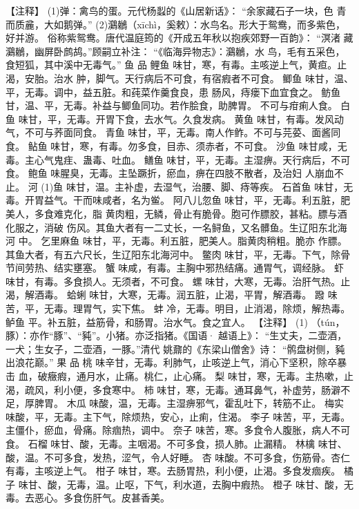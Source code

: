 \documentclass[12pt,UTF8]{ctexbook}
\begin{document}
【注释】
(1)弹：禽鸟的蛋。元代杨蠫的《山居新话》：
“余家藏石子一块，色
青而质麄，大如鹅弹。”
(2)鸂鶒（xīchì，奚敕）：水鸟名。形大于鸳鸯，而多紫色，好并游。
俗称紫鸳鸯。唐代温庭筠的《开成五年秋以抱疾郊野一百韵》：
“溟渚
藏鸂鶒，幽屏卧鹧鸪。”顾嗣立补注：
“《临海异物志》：鸂鶒，水
鸟，毛有五采色，食短狐，其中溪中无毒气。”
鱼 品
鲤鱼 味甘，寒，有毒。主咳逆上气，黄疸。止渴，安胎。治水
肿，脚气。天行病后不可食，有宿瘕者不可食。
鲫鱼 味甘，温、平，无毒。调中，益五脏。和莼菜作羹食良，患
肠风，痔瘘下血宜食之。
鲂鱼 甘，温、平，无毒。补益与鲫鱼同功。若作脍食，助脾胃。
不可与疳痢人食。
白鱼 味甘，平，无毒。开胃下食，去水气。久食发病。
黄鱼 味甘，有毒。发风动气，不可与荞面同食。
青鱼 味甘，平，无毒。南人作鲊。不可与芫荽、面酱同食。
鲇鱼 味甘，寒，有毒。勿多食，目赤、须赤者，不可食。
沙鱼 味甘咸，无毒。主心气鬼疰、蛊毒、吐血。
鳝鱼 味甘，平，无毒。主湿痹。天行病后，不可食。
鲍鱼 味腥臭，无毒。主坠蹶折，瘀血，痹在四肢不散者，及治妇
人崩血不止。
河 (1)鱼 味甘，温。主补虚，去湿气，治腰、脚、痔等疾。
石首鱼 味甘，无毒。开胃益气。干而味咸者，名为鲎。
阿八儿忽鱼 味甘，平，无毒。利五脏，肥美人，多食难克化，脂
黄肉粗，无鳞，骨止有脆骨。胞可作膘胶，甚粘。膘与酒化服之，消破
伤风。其鱼大者有一二丈长，一名鲟鱼，又名髒鱼。生辽阳东北海河
中。
乞里麻鱼 味甘，平，无毒。利五脏，肥美人。脂黄肉稍粗。脆亦
作膘。其鱼大者，有五六尺长，生辽阳东北海河中。
鳖肉 味甘，平，无毒。下气，除骨节间劳热、结实壅塞。
蟹 味咸，有毒。主胸中邪热结痛。通胃气，调经脉。
虾 味甘，有毒。多食损人。无须者，不可食。
螺 味甘，大寒，无毒。治肝气热。止渴，解酒毒。
蛤蜊 味甘，大寒，无毒。润五脏，止渴，平胃，解酒毒。
蹳 味苦，平，无毒。理胃气，实下焦。
蚌 冷，无毒。明目，止消渴，除烦，解热毒。
鲈鱼 平。补五脏，益筋骨，和肠胃。治水气。食之宜人。
【注释】
(1) （tún，豚）：亦作“豚”、“豘”。小猪。亦泛指猪。《国语·
越语上》：
“生丈夫，二壶酒，一犬；生女子，二壶酒，一豚。”清代
姚鼐的《东梁山僧舍》诗：
“鹘盘树侧，豘出浪花巅。”
果 品
桃 味辛甘，无毒。利肺气，止咳逆上气，消心下坚积，除卒暴击
血，破癥瘕，通月水，止痛。桃仁，止心痛。
梨 味甘，寒，无毒。主热嗽，止渴，疏风，利小便，多食寒中。
柿 味甘，寒，无毒。通耳鼻气，补虚劳，肠澼不足，厚脾胃。
木瓜 味酸，温，无毒。主湿痹邪气，霍乱吐下，转筋不止。
梅实 味酸，平，无毒。主下气，除烦热，安心，止痢，住渴。
李子 味苦，平，无毒。主僵仆，瘀血，骨痛。除痼热，调中。
奈子 味苦，寒。多食令人腹胀，病人不可食。
石榴 味甘、酸，无毒。主咽渴。不可多食，损人肺。止漏精。
林檎 味甘、酸，温。不可多食，发热，涩气，令人好睡。
杏 味酸。不可多食，伤筋骨。杏仁有毒，主咳逆上气。
柑子 味甘，寒。去肠胃热，利小便，止渴。多食发痼疾。
橘子 味甘、酸，无毒，温。止呕，下气，利水道，去胸中瘕热。
橙子 味甘、酸，无毒。去恶心。多食伤肝气。皮甚香美。
\end{document}
